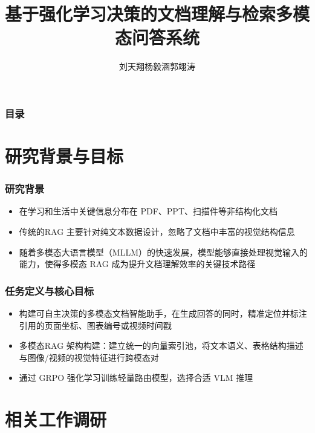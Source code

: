 \documentclass[AutoFakeBold,AutoFakeSlant]{beamer}
\title[多模态大模型项目开题报告]{基于强化学习决策的文档理解与检索多模态问答系统}
\institute[Sun Yat-Sen University]{
  中山大学计算机学院
  }
\date[\today]{\ctoday}
\begin{document}
\newtheorem{assumption}{假设}

\author[刘天翔\quad 杨毅涵\quad  郭翊涛]{
  刘天翔\quad 杨毅涵\quad  郭翊涛 
  \texorpdfstring{\\}{}
}

\begin{frame}
  \titlepage
\end{frame}
\setcounter{framenumber}{0}

\begin{frame}
  \frametitle{目\quad 录}
  \tableofcontents[hideallsubsections]
\end{frame}

\section{研究背景与目标}

\begin{frame}
  \frametitle{研究背景}
  \begin{itemize}
    \item 在学习和生活中关键信息分布在 PDF、PPT、扫描件等非结构化文档
    \item 传统的RAG 主要针对纯文本数据设计，忽略了文档中丰富的视觉结构信息
    \item 随着多模态大语言模型（MLLM）的快速发展，模型能够直接处理视觉输入的能力，使得多模态 RAG 成为提升文档理解效率的关键技术路径
  \end{itemize}
\end{frame}

\begin{frame}
  \frametitle{任务定义与核心目标}
  \begin{itemize}
    \item 构建可自主决策的多模态文档智能助手，在生成回答的同时，精准定位并标注引用的页面坐标、图表编号或视频时间戳
    \item 多模态RAG 架构构建：建立统一的向量索引池，将文本语义、表格结构描述与图像/视频的视觉特征进行跨模态对
    \item 通过 GRPO 强化学习训练轻量路由模型，选择合适 VLM 推理
  \end{itemize}
\end{frame}

\section{相关工作调研}
\end{document}
